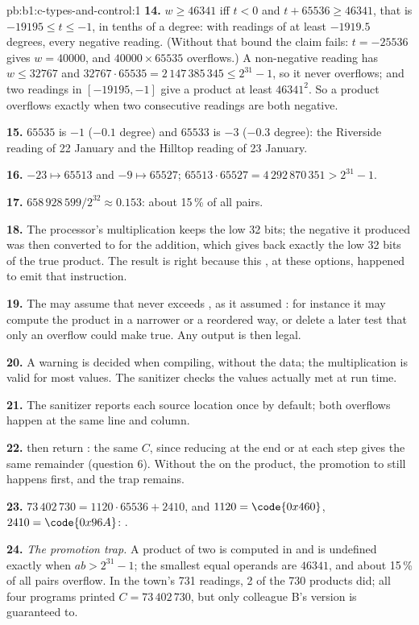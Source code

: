 \begin{solution}{pb:b1:c-types-and-control:1}
\textbf{14.} $w \geq 46341$ iff $t < 0$ and $t + 65536 \geq 46341$, that is $-19195 \leq t \leq -1$, in tenths of a
degree: with readings of at least $-1919.5$ degrees, every negative reading. (Without that bound the claim fails:
$t = -25536$ gives $w = 40000$, and $40000 \times 65535$ overflows.) A non-negative reading has $w \leq 32767$ and $32767 \cdot 65535 = 2\,147\,385\,345
\leq 2^{31} - 1$, so it never overflows; and two readings in $[-19195, -1]$ give a product at least $46341^2$. So a
product overflows exactly when two consecutive readings are both negative.

\textbf{15.} $65535$ is $-1$ ($-0.1$ degree) and $65533$ is $-3$ ($-0.3$ degree): the Riverside reading of 22 January
and the Hilltop reading of 23 January.

\textbf{16.} $-23 \mapsto 65513$ and $-9 \mapsto 65527$; $65513 \cdot 65527 = 4\,292\,870\,351 > 2^{31} - 1$.

\textbf{17.} $658\,928\,599 / 2^{32} \approx 0.153$: about 15\,\% of all pairs.

\textbf{18.} The processor's multiplication keeps the low 32 bits; the negative  it produced was then
converted to  for the addition, which gives back exactly the low 32 bits of the true product. The
result is right because this , at these options, happened to emit that instruction.

\textbf{19.} The  may assume that  never exceeds , as it assumed
: for instance it may compute the product in a narrower or a reordered way, or delete a later test
that only an overflow could make true. Any output is then legal.

\textbf{20.} A warning is decided when compiling, without the data; the multiplication is valid for most values. The
sanitizer checks the values actually met at run time.

\textbf{21.} The sanitizer reports each source location once by default; both overflows happen at the same line and
column.

\textbf{22.}  then return : the same $C$, since
reducing at the end or at each step gives the same remainder (question 6). Without the  on the product, the
promotion to  still happens first, and the trap remains.

\textbf{23.} $73\,402\,730 = 1120 \cdot 65536 + 2410$, and $1120 = \code{0x460}$, $2410 = \code{0x96A}$:
.

\textbf{24.} \emph{The promotion trap.} A product of two  is computed in  and is undefined
exactly when $ab > 2^{31} - 1$; the smallest equal operands are $46341$, and about 15\,\% of all pairs overflow. In
the town's 731 readings, 2 of the 730 products did; all four programs printed $C = 73\,402\,730$, but only
colleague B's version is guaranteed to.
\end{solution}
